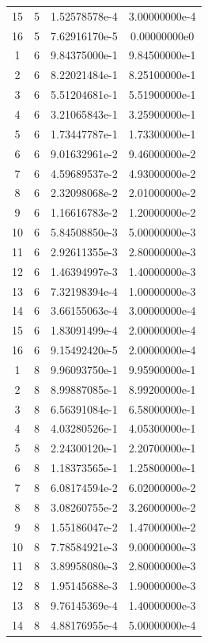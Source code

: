 \begin{table}[h]
\begin{tabular}{|c|c|c|c|}
15 & 5 & 1.52578578e-4 & 3.00000000e-4 \\
16 & 5 & 7.62916170e-5 & 0.00000000e0 \\
1 & 6 & 9.84375000e-1 & 9.84500000e-1 \\
2 & 6 & 8.22021484e-1 & 8.25100000e-1 \\
3 & 6 & 5.51204681e-1 & 5.51900000e-1 \\
4 & 6 & 3.21065843e-1 & 3.25900000e-1 \\
5 & 6 & 1.73447787e-1 & 1.73300000e-1 \\
6 & 6 & 9.01632961e-2 & 9.46000000e-2 \\
7 & 6 & 4.59689537e-2 & 4.93000000e-2 \\
8 & 6 & 2.32098068e-2 & 2.01000000e-2 \\
9 & 6 & 1.16616783e-2 & 1.20000000e-2 \\
10 & 6 & 5.84508850e-3 & 5.00000000e-3 \\
11 & 6 & 2.92611355e-3 & 2.80000000e-3 \\
12 & 6 & 1.46394997e-3 & 1.40000000e-3 \\
13 & 6 & 7.32198394e-4 & 1.00000000e-3 \\
14 & 6 & 3.66155063e-4 & 3.00000000e-4 \\
15 & 6 & 1.83091499e-4 & 2.00000000e-4 \\
16 & 6 & 9.15492420e-5 & 2.00000000e-4 \\
1 & 8 & 9.96093750e-1 & 9.95900000e-1 \\
2 & 8 & 8.99887085e-1 & 8.99200000e-1 \\
3 & 8 & 6.56391084e-1 & 6.58000000e-1 \\
4 & 8 & 4.03280526e-1 & 4.05300000e-1 \\
5 & 8 & 2.24300120e-1 & 2.20700000e-1 \\
6 & 8 & 1.18373565e-1 & 1.25800000e-1 \\
7 & 8 & 6.08174594e-2 & 6.02000000e-2 \\
8 & 8 & 3.08260755e-2 & 3.26000000e-2 \\
9 & 8 & 1.55186047e-2 & 1.47000000e-2 \\
10 & 8 & 7.78584921e-3 & 9.00000000e-3 \\
11 & 8 & 3.89958080e-3 & 2.80000000e-3 \\
12 & 8 & 1.95145688e-3 & 1.90000000e-3 \\
13 & 8 & 9.76145369e-4 & 1.40000000e-3 \\
14 & 8 & 4.88176955e-4 & 5.00000000e-4 \\

\end{tabular}
\end{table}
